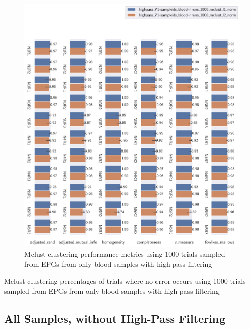 \begin{theappendices}
\begin{figure}[htbp]
\centering
\includegraphics[width=\textwidth]{./figures/clust_comparison/highpass_71-sampleids_blood-nruns_1000_mclust.pdf}
\caption{Mclust clustering performance metrics using 1000 trials sampled from EPGs from only blood samples with high-pass filtering}
\label{appendix:fig:highpass_71-sampleids_blood-nruns_1000_mclust}
\end{figure}

\begin{table}[htbp]
\centering
{}
\caption{Mclust clustering percentages of trials where no error occurs using 1000 trials sampled from EPGs from only blood samples with high-pass filtering}
\label{appendix:table:highpass_71-sampleids_blood-nruns_1000_mclust}
\end{table}

\FloatBarrier
\subsection{All Samples, without High-Pass Filtering}


\end{theappendices}
